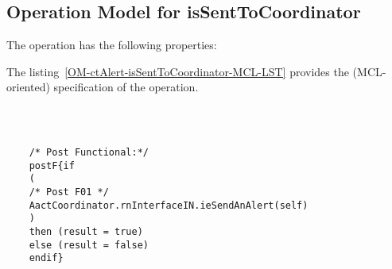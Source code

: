 \subsection{Operation Model for isSentToCoordinator}

\label{OM-isSentToCoordinator}


The  operation has the following properties:

	\begin{operationmodel}



		


	\end{operationmodel}



	\vspace{1cm}
	The listing~\ref{OM-ctAlert-isSentToCoordinator-MCL-LST} provides the \msrmessir (MCL-oriented) specification of the operation.
	
	\scriptsize
	\vspace{0.5cm}
	\begin{lstlisting}[style=MessirStyle,firstnumber=auto,captionpos=b,caption={\msrmessir (MCL-oriented) specification of the operation \emph{isSentToCoordinator}.},label=OM-ctAlert-isSentToCoordinator-MCL-LST]

	
	
	/* Post Functional:*/ 
	postF{if
	(
	/* Post F01 */
	AactCoordinator.rnInterfaceIN.ieSendAnAlert(self)
	)
	then (result = true)
	else (result = false)
	endif}
	
	
	\end{lstlisting}
	\normalsize 
	
	
	
	





